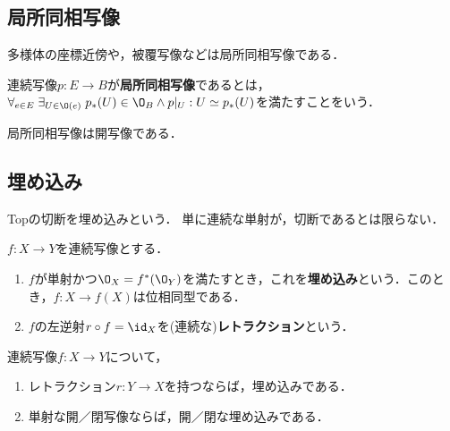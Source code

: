 \documentclass[uplatex,dvipdfmx]{jsreport}
\begin{document}
\subsection{局所同相写像}

\begin{tcolorbox}[colframe=ForestGreen, colback=ForestGreen!10!white,breakable,colbacktitle=ForestGreen!40!white,coltitle=black,fonttitle=\bfseries\sffamily,
title=]
    多様体の座標近傍や，被覆写像などは局所同相写像である．
\end{tcolorbox}

\begin{definition}
    連続写像$p:E\to B$が\textbf{局所同相写像}であるとは，
    $\forall_{e\in E}\;\exists_{U\in\O(e)}\;p_*(U)\in\O_B\land p|_U:U\simeq p_*(U)$を満たすことをいう．
\end{definition}

\begin{proposition}
    局所同相写像は開写像である．
\end{proposition}

\subsection{埋め込み}

\begin{tcolorbox}[colframe=ForestGreen, colback=ForestGreen!10!white,breakable,colbacktitle=ForestGreen!40!white,coltitle=black,fonttitle=\bfseries\sffamily,
title=]
    Topの切断を埋め込みという．
    単に連続な単射が，切断であるとは限らない．
\end{tcolorbox}

\begin{definition}
    $f:X\to Y$を連続写像とする．
    \begin{enumerate}
        \item $f$が単射かつ$\O_X=f^*(\O_Y)$を満たすとき，これを\textbf{埋め込み}という．このとき，$f:X\to f(X)$は位相同型である．
        \item $f$の左逆射$r\circ f=\id_X$を(連続な)\textbf{レトラクション}という．
    \end{enumerate}
\end{definition}

\begin{proposition}[埋め込みであることの十分条件]
    連続写像$f:X\to Y$について，
    \begin{enumerate}
        \item レトラクション$r:Y\to X$を持つならば，埋め込みである．
        \item 単射な開／閉写像ならば，開／閉な埋め込みである．
    \end{enumerate}
\end{proposition}
\end{document}
